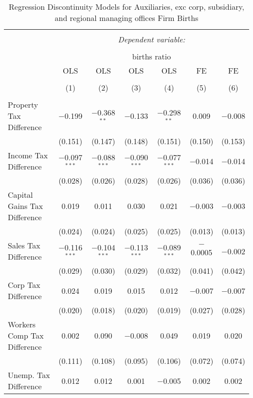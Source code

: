 
\begin{table}[!htbp] \centering 
  \caption{Regression Discontinuity Models for  Auxiliaries, exc corp, subsidiary, and regional managing offices Firm Births} 
  \label{95rd} 
\begin{tabular}{@{\extracolsep{5pt}}lcccccc} 
\\[-1.8ex]\hline 
\hline \\[-1.8ex] 
 & \multicolumn{6}{c}{\textit{Dependent variable:}} \\ 
\cline{2-7} 
\\[-1.8ex] & \multicolumn{6}{c}{births ratio} \\ 
 & OLS & OLS & OLS & OLS & FE & FE \\ 
\\[-1.8ex] & (1) & (2) & (3) & (4) & (5) & (6)\\ 
\hline \\[-1.8ex] 
 Property Tax Difference & $-$0.199 & $-$0.368$^{**}$ & $-$0.133 & $-$0.298$^{**}$ & 0.009 & $-$0.008 \\ 
  & (0.151) & (0.147) & (0.148) & (0.151) & (0.150) & (0.153) \\ 
  Income Tax Difference & $-$0.097$^{***}$ & $-$0.088$^{***}$ & $-$0.090$^{***}$ & $-$0.077$^{***}$ & $-$0.014 & $-$0.014 \\ 
  & (0.028) & (0.026) & (0.028) & (0.026) & (0.036) & (0.036) \\ 
  Capital Gains Tax Difference & 0.019 & 0.011 & 0.030 & 0.021 & $-$0.003 & $-$0.003 \\ 
  & (0.024) & (0.024) & (0.025) & (0.025) & (0.013) & (0.013) \\ 
  Sales Tax Difference & $-$0.116$^{***}$ & $-$0.104$^{***}$ & $-$0.113$^{***}$ & $-$0.089$^{***}$ & $-$0.0005 & $-$0.002 \\ 
  & (0.029) & (0.030) & (0.029) & (0.032) & (0.041) & (0.042) \\ 
  Corp Tax Difference & 0.024 & 0.019 & 0.015 & 0.012 & $-$0.007 & $-$0.007 \\ 
  & (0.020) & (0.018) & (0.020) & (0.019) & (0.027) & (0.028) \\ 
  Workers Comp Tax Difference & 0.002 & 0.090 & $-$0.008 & 0.049 & 0.019 & 0.020 \\ 
  & (0.111) & (0.108) & (0.095) & (0.106) & (0.072) & (0.074) \\ 
  Unemp. Tax Difference & 0.012 & 0.012 & 0.001 & $-$0.005 & 0.002 & 0.002 \\ 

\end{tabular}
\end{table}
